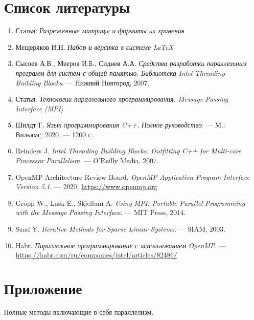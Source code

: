 \documentclass[12pt]{article}
\begin{document}
\section{Список литературы}
\begin{enumerate}
\item Статья: \textit{Разреженные матрицы и форматы их хранения}
\item Мещеряков И.Н. \textit{Набор и вёрстка в системе \LaTeX}
\item Сысоев А.В., Мееров И.Б., Сиднев А.А. \textit{Средства разработки параллельных программ для систем с общей памятью. Библиотека Intel Threading Building Blocks}. — Нижний Новгород, 2007.
\item Статья: \textit{Технологии параллельного программирования. Message Passing Interface (MPI)}
\item Шилдт Г. \textit{Язык программирования C++. Полное руководство}. — М.: Вильямс, 2020. — 1200 с.
\item Reinders J. \textit{Intel Threading Building Blocks: Outfitting C++ for Multi-core Processor Parallelism}. — O'Reilly Media, 2007.
\item OpenMP Architecture Review Board. \textit{OpenMP Application Program Interface Version 5.1}. — 2020. \url{https://www.openmp.org}
\item Gropp W., Lusk E., Skjellum A. \textit{Using MPI: Portable Parallel Programming with the Message Passing Interface}. — MIT Press, 2014.
\item Saad Y. \textit{Iterative Methods for Sparse Linear Systems}. — SIAM, 2003.
\item Habr. \textit{Параллельное программирование с использованием OpenMP}. — \url{https://habr.com/ru/companies/intel/articles/82486/}
\end{enumerate}
\appendix
\newpage
\section*{Приложение}

Полные методы включающие в себя параллелизм.
\end{document}

